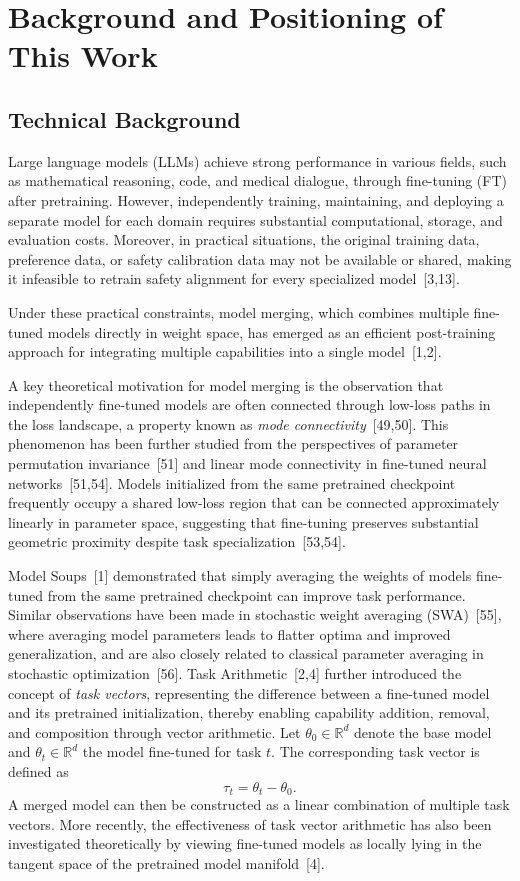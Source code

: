 \section{Background and Positioning of This Work}
\label{app:本研究の背景と定式化上の位置づけ}

\subsection{Technical Background}

Large language models (LLMs) achieve strong performance in various fields, such as mathematical reasoning, code, and medical dialogue, through fine-tuning (FT) after pretraining. However, independently training, maintaining, and deploying a separate model for each domain requires substantial computational, storage, and evaluation costs. Moreover, in practical situations, the original training data, preference data, or safety calibration data may not be available or shared, making it infeasible to retrain safety alignment for every specialized model~[3,13].


Under these practical constraints, model merging, which combines multiple fine-tuned models directly in weight space, has emerged as an efficient post-training approach for integrating multiple capabilities into a single model~[1,2].

A key theoretical motivation for model merging is the observation that independently fine-tuned models are often connected through low-loss paths in the loss landscape, a property known as \emph{mode connectivity}~[49,50]. This phenomenon has been further studied from the perspectives of parameter permutation invariance~[51] and linear mode connectivity in fine-tuned neural networks~[51,54]. Models initialized from the same pretrained checkpoint frequently occupy a shared low-loss region that can be connected approximately linearly in parameter space, suggesting that fine-tuning preserves substantial geometric proximity despite task specialization~[53,54].


Model Soups~[1] demonstrated that simply averaging the weights of models fine-tuned from the same pretrained checkpoint can improve task performance. Similar observations have been made in stochastic weight averaging (SWA)~[55], where averaging model parameters leads to flatter optima and improved generalization, and are also closely related to classical parameter averaging in stochastic optimization~[56]. Task Arithmetic~[2,4] further introduced the concept of \emph{task vectors}, representing the difference between a fine-tuned model and its pretrained initialization, thereby enabling capability addition, removal, and composition through vector arithmetic. Let $\theta_0 \in \mathbb{R}^d$ denote the base model and $\theta_t \in \mathbb{R}^d$ the model fine-tuned for task $t$. The corresponding task vector is defined as
\[
\tau_t = \theta_t - \theta_0.
\]
A merged model can then be constructed as a linear combination of multiple task vectors. More recently, the effectiveness of task vector arithmetic has also been investigated theoretically by viewing fine-tuned models as locally lying in the tangent space of the pretrained model manifold~[4].

